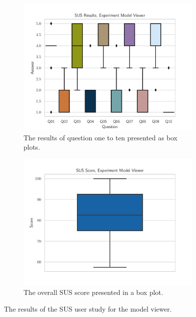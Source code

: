 \begin{figure}[htpb]
  \centering
  \begin{subfigure}{.45\textwidth}%
    \centering
    \includegraphics[width=\textwidth]{figures/evaluation/res_exp_mv.pdf}
    \caption{The results of question one to ten presented as box plots.}\label{fig:ubii-er-client}
  \end{subfigure}%
  \hspace{0.1\textwidth}%
  \begin{subfigure}{.45\textwidth}%
    \centering
    \includegraphics[width=\textwidth]{figures/evaluation/score_exp_mv.pdf}
    \caption{The overall \ac{SUS} score presented in a box plot.}\label{fig:ubii-er-server}
  \end{subfigure}%
  \caption[UBII components diagram]{The results of the \ac{SUS} user study for the model viewer.}\label{fig:ubii-er}
\end{figure}